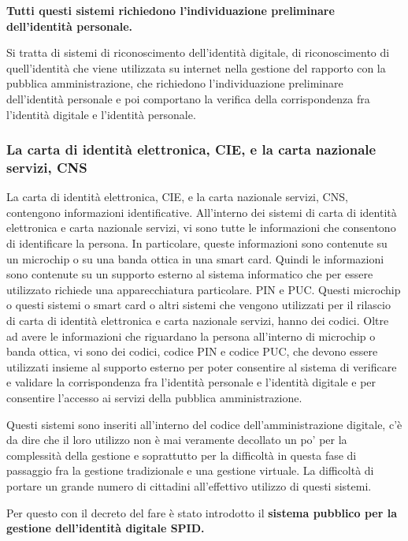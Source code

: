  \textbf{Tutti questi sistemi richiedono l'individuazione preliminare dell'identità personale.}\par
 Si tratta di sistemi di riconoscimento dell'identità digitale, di riconoscimento di quell'identità che viene utilizzata su internet nella gestione del rapporto con la pubblica amministrazione, che richiedono l'individuazione preliminare dell'identità personale e poi comportano la verifica della corrispondenza fra l'identità digitale e l'identità personale. 

\subsubsection{La carta di identità elettronica, CIE, e la carta nazionale servizi, CNS}
 
 La carta di identità elettronica, CIE, e la carta nazionale servizi, CNS, contengono informazioni identificative. All'interno dei sistemi di carta di identità elettronica e carta nazionale servizi, vi sono tutte le informazioni che consentono di identificare la persona. In particolare, queste informazioni sono contenute su un microchip o su una banda ottica in una smart card. Quindi le informazioni sono contenute su un supporto esterno al sistema informatico che per essere utilizzato richiede una apparecchiatura particolare. 
 PIN e PUC. Questi microchip o questi sistemi o smart card o altri sistemi che vengono utilizzati per il rilascio di carta di identità elettronica e carta nazionale servizi, hanno dei codici. Oltre ad avere le informazioni che riguardano la persona all'interno di microchip o banda ottica, vi sono dei codici, codice PIN e codice PUC, che devono essere utilizzati insieme al supporto esterno per poter consentire al sistema di verificare e validare la corrispondenza fra l'identità personale e l'identità digitale e per consentire l'accesso ai servizi della pubblica amministrazione. \par
 Questi sistemi sono inseriti all'interno del codice dell'amministrazione digitale, c'è da dire che il loro utilizzo non è mai veramente decollato un po' per la complessità della gestione e soprattutto per la difficoltà in questa fase di passaggio fra la gestione tradizionale e una gestione virtuale. La difficoltà di portare un grande numero di cittadini all'effettivo utilizzo di questi sistemi. \par
 Per questo con il decreto del fare è stato introdotto il \textbf{sistema pubblico per la gestione dell'identità digitale SPID.}\par 
 
